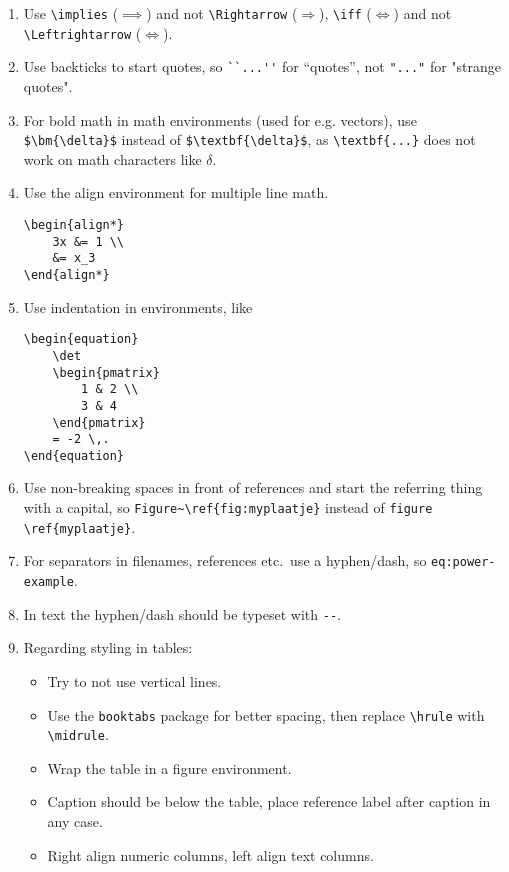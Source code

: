 \documentclass[11pt]{exam}
\begin{document}
\begin{enumerate}
        \item Use \verb|\implies| ($\implies$) and not \verb|\Rightarrow| ($\Rightarrow$), \verb|\iff| ($\iff$) and not \verb|\Leftrightarrow| ($\Leftrightarrow$).

        \item Use backticks to start quotes, so \verb|``...''| for ``quotes'', not \verb|"..."| for "strange quotes".

        \item For bold math in math environments (used for e.g. vectors), use \verb|$\bm{\delta}$| instead of \verb|$\textbf{\delta}$|, as        \verb|\textbf{...}| does not work on math characters like $\delta$.

        \item Use the align environment for multiple line math.
            \begin{lstlisting}
\begin{align*}
    3x &= 1 \\
    &= x_3
\end{align*}
            \end{lstlisting}

        \item Use indentation in environments, like
            \begin{lstlisting}
\begin{equation}
    \det
    \begin{pmatrix}
        1 & 2 \\
        3 & 4
    \end{pmatrix}
    = -2 \,.
\end{equation}
            \end{lstlisting}
        \item Use non-breaking spaces in front of references and start the referring thing with a capital, so \verb|Figure~\ref{fig:myplaatje}| instead of \verb|figure \ref{myplaatje}|.
        \item For separators in filenames, references etc.\ use a hyphen/dash, so \verb|eq:power-example|.
        \item In text the hyphen/dash should be typeset with \verb|--|.
        \item Regarding styling in tables:
        \begin{itemize}
            \item Try to not use vertical lines.
            \item Use the \verb|booktabs| package for better spacing, then replace \verb|\hrule| with \verb|\midrule|.
            \item Wrap the table in a figure environment.
            \item Caption should be below the table, place reference label after caption in any case.
            \item Right align numeric columns, left align text columns.
        \end{itemize}
    \end{enumerate}
\end{document}
